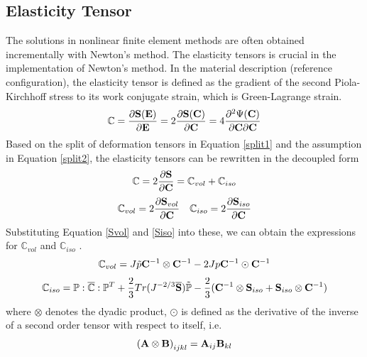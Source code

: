 \subsection{Elasticity Tensor}
The solutions in nonlinear finite element methods are often obtained incrementally with Newton's method. The elasticity tensors is crucial in the implementation of Newton's method.
In the material description (reference configuration), the elasticity tensor is defined as the gradient of the second Piola-Kirchhoff stress to its work conjugate strain, which is Green-Lagrange strain.
\begin{equation}
\mathbb{C} = \frac{\partial{\bold{S}(\bold{E})}}{\partial{\bold{E}}} =  2\frac{\partial{\bold{S}(\bold{C})}} {\partial{\bold{C}}} = 4 \frac{\partial^2{\Psi(\bold{C})}}{{\partial{\bold{C}}}{\partial{\bold{C}}}}
\end{equation}
Based on the split of deformation tensors in Equation \ref{split1} and the assumption in Equation \ref{split2}, the elasticity tensors can be rewritten in the decoupled form
\begin{equation} \label{C}
\mathbb{C} = 2\frac{\partial{\bold{S}}}{\partial{\bold{C}}} = \mathbb{C}_{vol} + \mathbb{C}_{iso} 
\end{equation}
\begin{equation} \label{Cvol}
\mathbb{C}_{vol} = 2\frac{\partial{\bold{S}_{vol}}}{\partial{\bold{C}}}
\quad
\mathbb{C}_{iso} = 2\frac{\partial{\bold{S}_{iso}}}{\partial{\bold{C}}}
\end{equation}
Substituting Equation \ref{Svol} and \ref{Siso}  into these, we can obtain the expressions for $\mathbb{C}_{vol}$ and $\mathbb{C}_{iso}$ .
\begin{equation} \label{Cvol}
\mathbb{C}_{vol} = J\tilde{p}\bold{C}^{-1}\otimes\bold{C}^{-1} - 2Jp\bold{C}^{-1}\odot\bold{C}^{-1}
\end{equation}
\begin{equation} \label{Ciso}
\mathbb{C}_{iso} = \mathbb{P} : \overline{\mathbb{C}} : \mathbb{P}^T + \frac{2}{3}Tr(J^{-2/3}\overline{\bold{S}})\tilde{\mathbb{P}} - \frac{2}{3}(\bold{C}^{-1}\otimes\bold{S}_{iso} + \bold{S}_{iso}\otimes \bold{C}^{-1})
\end{equation}
where $\otimes$ denotes the dyadic product, $\odot$ is defined as the derivative of the inverse of a second order tensor with respect to itself, i.e.
\begin{equation}\label{dyadic}
{(\bold{A} \otimes \bold{B})}_{ijkl} = {\bold{A}}_{ij}{\bold{B}}_{kl}
\end{equation}
